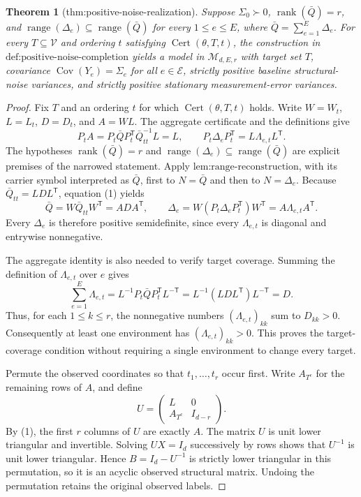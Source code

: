 \documentclass{article}
\newtheorem{theorem}{Theorem}
\begin{document}
\begin{theorem}[thm:positive-noise-realization]\label{thm:positive-noise-realization}
Suppose \(\Sigma_0\succ0\), \(\operatorname{rank}(\bar Q)=r\), and \(\operatorname{range}(\Delta_e)\subseteq\operatorname{range}(\bar Q)\) for every \(1\le e\le E\), where \(\bar Q=\sum_{e=1}^E\Delta_e\).  For every \(T\subseteq\mathcal V\) and ordering \(t\) satisfying \(\operatorname{Cert}(\theta,T,t)\), the construction in \(\text{def:positive-noise-completion}\) yields a model in \(\mathcal M_{d,E,r}\) with target set \(T\), covariance \(\operatorname{Cov}(Y_e)=\Sigma_e\) for all \(e\in\mathcal E\), strictly positive baseline structural-noise variances, and strictly positive stationary measurement-error variances.
\end{theorem}
\begin{proof}
Fix \(T\) and an ordering \(t\) for which \(\operatorname{Cert}(\theta,T,t)\) holds.  Write \(W=W_t\), \(L=L_t\), \(D=D_t\), and \(A=WL\).  The aggregate certificate and the definitions give
\[
 P_tA=P_t\bar QP_t^{\mathsf T}\bar Q_{tt}^{-1}L=L,
 \qquad
 P_t\Delta_eP_t^{\mathsf T}=L\Lambda_{e,t}L^{\mathsf T}. \tag{1}
\]
The hypotheses \(\operatorname{rank}(\bar Q)=r\) and \(\operatorname{range}(\Delta_e)\subseteq\operatorname{range}(\bar Q)\) are explicit premises of the narrowed statement.  Apply \(\text{lem:range-reconstruction}\), with its carrier symbol interpreted as \(\bar Q\), first to \(N=\bar Q\) and then to \(N=\Delta_e\).  Because \(\bar Q_{tt}=LDL^{\mathsf T}\), equation (1) yields
\[
 \bar Q=W\bar Q_{tt}W^{\mathsf T}=ADA^{\mathsf T},
 \qquad
 \Delta_e=W(P_t\Delta_eP_t^{\mathsf T})W^{\mathsf T}
 =A\Lambda_{e,t}A^{\mathsf T}. \tag{2}
\]
Every \(\Delta_e\) is therefore positive semidefinite, since every \(\Lambda_{e,t}\) is diagonal and entrywise nonnegative.

The aggregate identity is also needed to verify target coverage.  Summing the definition of \(\Lambda_{e,t}\) over \(e\) gives
\[
 \sum_{e=1}^E\Lambda_{e,t}
 =L^{-1}P_t\bar QP_t^{\mathsf T}L^{-\mathsf T}
 =L^{-1}(LDL^{\mathsf T})L^{-\mathsf T}=D. \tag{3}
\]
Thus, for each \(1\le k\le r\), the nonnegative numbers \((\Lambda_{e,t})_{kk}\) sum to \(D_{kk}>0\).  Consequently at least one environment has \((\Lambda_{e,t})_{kk}>0\).  This proves the target-coverage condition without requiring a single environment to change every target.

Permute the observed coordinates so that \(t_1,\ldots,t_r\) occur first.  Write \(A_{T^c}\) for the remaining rows of \(A\), and define
\[
 U=\begin{pmatrix}L&0\\ A_{T^c}&I_{d-r}\end{pmatrix}. \tag{4}
\]
By (1), the first \(r\) columns of \(U\) are exactly \(A\).  The matrix \(U\) is unit lower triangular and invertible.  Solving \(UX=I_d\) successively by rows shows that \(U^{-1}\) is unit lower triangular.  Hence \(B=I_d-U^{-1}\) is strictly lower triangular in this permutation, so it is an acyclic observed structural matrix.  Undoing the permutation retains the original observed labels.


\end{proof}
\end{document}
